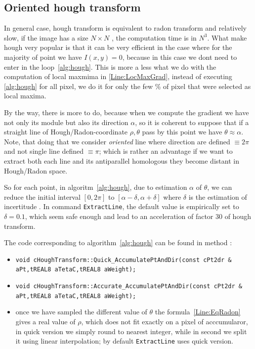 
\subsection{Oriented hough transform}

In general case, hough transform is equivalent to radon transform and relatively
slow, if the image has a size $N \times N$ , the computation time is in $N^3$.
What make hough very popular is that it can be very efficient in the case where
for the majority of point  we have $I(x,y) =0 $, because in this case we dont
need to enter in the loop~\ref{alg:hough}.
This is more a less what we do  with the computation of local maxmima in \ref{Line:LocMaxGrad},
instead of executing \ref{alg:hough} for all pixel, we do it for only the few \% of pixel
that were selected as local maxima.

By the way, there is more to do, because when we compute the gradient we have not only
its module but also its direction $\alpha$, so it is coherent to suppose that if
a straight line of  Hough/Radon-coordinate $\rho,\theta$ pass by this point we have $\theta \approx \alpha$.
Note, that doing that we consider \emph{oriented} line where direction are defined $\equiv 2 \pi$
and not single line defined  $\equiv \pi$; which is rather an advantage  if we want to
extract both each line and its antiparallel homologous they become distant in Hough/Radon space. 

So for each point, in  algoritm~\ref{alg:hough},
due to estimation $\alpha$ of $\theta$, we can reduce the initial
interval $[0,2\pi]$  to  $[\alpha-\delta,\alpha+\delta]$ where $\delta$ is  
the estimation of incertitude .  In command {\tt ExtractLine}, the default value
is empirically set to $\delta=0.1$, which seem safe enough and lead to an acceleration
of factor $30$ of hough transform.


The code corresponding to algorithm~\ref{alg:hough} can be found in method  :
\begin{itemize}
  \item {\tt void  cHoughTransform::Quick\_AccumulatePtAndDir(const cPt2dr \& aPt,tREAL8 aTetaC,tREAL8 aWeight); }
  \item {\tt void  cHoughTransform::Accurate\_AccumulatePtAndDir(const cPt2dr \& aPt,tREAL8 aTetaC,tREAL8 aWeight); }

  \item  once we have sampled the different value of $\theta$ the formula~\ref{Line:EqRadon} gives a real value
         of $\rho$, which does not fit exactly on a pixel of acccumularor, in quick version we simply round
         to nearest integer, while in second we split it using linear interpolation; by default  {\tt ExtractLine}
         uses quick version.
\end{itemize}

